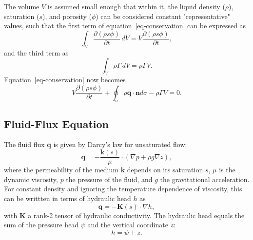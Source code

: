 \documentclass[fleqn]{article}
\begin{document}
The volume $V$ is assumed small enough that within it, the
liquid density ($\rho$), saturation ($s$), and porosity ($\phi$) can be
considered constant "representative" values, such that the first term of
equation~\ref{eq-conservation} can be expressed as
\begin{equation}
  \int_V \frac{\partial (\rho s \phi)}{\partial t} \,dV = 
  V \frac{\partial (\rho s \phi)}{\partial t},
\end{equation}
and the third term as
\begin{equation}
  \int_V \rho \Gamma \,dV = \rho \Gamma V.
\end{equation}
Equation~\ref{eq-conservation} now becomes
\begin{equation}
  V \frac{\partial (\rho s \phi)}{\partial t} +
  \oint_\sigma \rho \mathbf{q} \cdot \mathbf{n} d\sigma -
  \rho \Gamma V = 0.
\end{equation}

\subsection{Fluid-Flux Equation}
The fluid flux $\mathbf{q}$ is given by Darcy's law for unsaturated flow:
\begin{equation}
  \mathbf{q} = - \frac{\mathbf{k}(s)}{\mu} \cdot ( \nabla p + \rho g \nabla z ),
\end{equation}
where the permeability of the medium $\mathbf{k}$ depends on its saturation $s$,
$\mu$ is the dynamic viscosity, $p$ the pressure of the fluid, and $g$ the
gravitational acceleration. For constant density and ignoring the temperature
dependence of viscosity, this can be writtten in terms of hydraulic head
$h$ as
\begin{equation}
  \mathbf{q} = - \mathbf{K}(s) \cdot \nabla h,
  \label{eq-unsat-darcy-flux}
\end{equation}
with $\mathbf{K}$ a rank-2 tensor of hydraulic conductivity. The hydraulic
head equals the sum of the pressure head $\psi$ and the vertical
coordinate $z$:
\begin{equation}
  h = \psi + z.
\end{equation}
\end{document}
